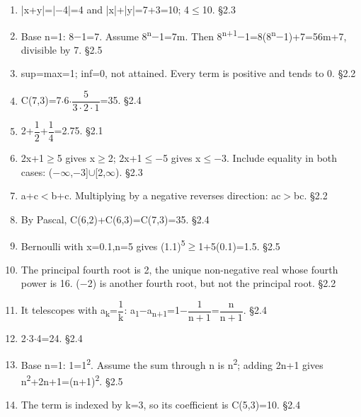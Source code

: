 \documentclass[11pt]{article}
\begin{document}
\begin{keepsection}
\begin{enumerate}
\item |x+y|=|\ensuremath{-}4|=4 and |x|+|y|=7+3=10; 4\ensuremath{\leq}10. \hfill{\small\color{FAUblue}§2.3}
\item Base n=1: 8\ensuremath{-}1=7. Assume 8\textsuperscript{n}\ensuremath{-}1=7m. Then 8\textsuperscript{n+1}\ensuremath{-}1=8(8\textsuperscript{n}\ensuremath{-}1)+7=56m+7, divisible by 7. \hfill{\small\color{FAUblue}§2.5}
\item sup=max=1; inf=0, not attained. Every term is positive and tends to 0. \hfill{\small\color{FAUblue}§2.2}
\item C(7,3)=7\ensuremath{\cdot}6\ensuremath{\cdot}{\small\ensuremath{\dfrac{5}{3\cdot 2\cdot 1}}}=35. \hfill{\small\color{FAUblue}§2.4}
\item 2+{\small\ensuremath{\dfrac{1}{2}}}+{\small\ensuremath{\dfrac{1}{4}}}=2.75. \hfill{\small\color{FAUblue}§2.1}
\item 2x+1\ensuremath{\geq}5 gives x\ensuremath{\geq}2; 2x+1\ensuremath{\leq}\ensuremath{-}5 gives x\ensuremath{\leq}\ensuremath{-}3. Include equality in both cases: (\ensuremath{-}\ensuremath{\infty},\ensuremath{-}3]\ensuremath{\cup}[2,\ensuremath{\infty}). \hfill{\small\color{FAUblue}§2.3}
\item a+c\ensuremath{<}b+c. Multiplying by a negative reverses direction: ac\ensuremath{>}bc. \hfill{\small\color{FAUblue}§2.2}
\item By Pascal, C(6,2)+C(6,3)=C(7,3)=35. \hfill{\small\color{FAUblue}§2.4}
\item Bernoulli with x=0.1,n=5 gives (1.1)\textsuperscript{5}\ensuremath{\geq}1+5(0.1)=1.5. \hfill{\small\color{FAUblue}§2.5}
\item The principal fourth root is 2, the unique non-negative real whose fourth power is 16. (\ensuremath{-}2) is another fourth root, but not the principal root. \hfill{\small\color{FAUblue}§2.2}
\item It telescopes with a\textsubscript{k}={\small\ensuremath{\dfrac{1}{\mathrm{k}}}}: a\textsubscript{1}\ensuremath{-}a\textsubscript{n+1}=1\ensuremath{-}{\small\ensuremath{\dfrac{1}{\mathrm{n}+1}}}={\small\ensuremath{\dfrac{\mathrm{n}}{\mathrm{n}+1}}}. \hfill{\small\color{FAUblue}§2.4}
\item 2\ensuremath{\cdot}3\ensuremath{\cdot}4=24. \hfill{\small\color{FAUblue}§2.4}
\item Base n=1: 1=1\textsuperscript{2}. Assume the sum through n is n\textsuperscript{2}; adding 2n+1 gives n\textsuperscript{2}+2n+1=(n+1)\textsuperscript{2}. \hfill{\small\color{FAUblue}§2.5}
\item The term is indexed by k=3, so its coefficient is C(5,3)=10. \hfill{\small\color{FAUblue}§2.4}
\end{enumerate}

\end{keepsection}
\end{document}
